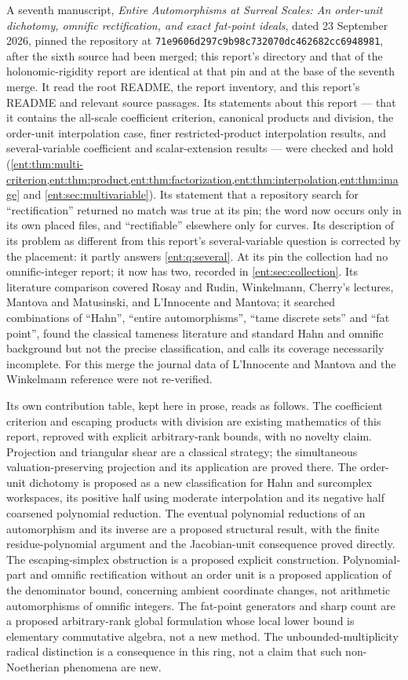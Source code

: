 \documentclass[11pt]{article}
\theoremstyle{plain}
\theoremstyle{plain}
\theoremstyle{plain}
\theoremstyle{definition}
\theoremstyle{definition}
\theoremstyle{definition}
\theoremstyle{definition}
\theoremstyle{remark}
\begin{document}
A seventh manuscript, \emph{Entire Automorphisms at Surreal Scales: An
order-unit dichotomy, omnific rectification, and exact fat-point ideals},
dated 23 September 2026, pinned the repository at
\texttt{71e9606d297c9b98c732\allowbreak 070dc462682cc6948981}, after the sixth
source had been merged; this report's directory and that of the
holonomic-rigidity report are identical at that pin and at the base of the
seventh merge. It read the root README, the report inventory, and this
report's README and relevant source passages. Its statements about this
report --- that it contains the all-scale coefficient criterion, canonical
products and division, the order-unit interpolation case, finer
restricted-product interpolation results, and several-variable coefficient and
scalar-extension results --- were checked and hold
(\cref{ent:thm:multi-criterion,ent:thm:product,ent:thm:factorization,ent:thm:interpolation,ent:thm:image}
and \cref{ent:sec:multivariable}). Its statement that a repository search for
``rectification'' returned no match was true at its pin; the word now occurs
only in its own placed files, and ``rectifiable'' elsewhere only for curves.
Its description of its problem as different from this report's
several-variable question is corrected by the placement: it partly answers
\cref{ent:q:several}. At its pin the collection had no omnific-integer
report; it now has two, recorded in \cref{ent:sec:collection}. Its literature
comparison covered Rosay and Rudin, Winkelmann, Cherry's lectures, Mantova and
Matusinski, and L'Innocente and Mantova; it searched combinations of
``Hahn'', ``entire automorphisms'', ``tame discrete sets'' and ``fat point'',
found the classical tameness literature and standard Hahn and omnific
background but not the precise classification, and calls its coverage
necessarily incomplete. For this merge the journal data of L'Innocente and
Mantova and the Winkelmann reference were not re-verified.

Its own contribution table, kept here in prose, reads as follows. The
coefficient criterion and escaping products with division are existing
mathematics of this report, reproved with explicit arbitrary-rank bounds, with
no novelty claim. Projection and triangular shear are a classical strategy;
the simultaneous valuation-preserving projection and its application are
proved there. The order-unit dichotomy is proposed as a new classification
for Hahn and surcomplex workspaces, its positive half using moderate
interpolation and its negative half coarsened polynomial reduction. The
eventual polynomial reductions of an automorphism and its inverse are a
proposed structural result, with the finite residue-polynomial argument and
the Jacobian-unit consequence proved directly. The escaping-simplex
obstruction is a proposed explicit construction. Polynomial-part and omnific
rectification without an order unit is a proposed application of the
denominator bound, concerning ambient coordinate changes, not arithmetic
automorphisms of omnific integers. The fat-point generators and sharp count
are a proposed arbitrary-rank global formulation whose local lower bound is
elementary commutative algebra, not a new method. The unbounded-multiplicity
radical distinction is a consequence in this ring, not a claim that such
non-Noetherian phenomena are new.
\end{document}
